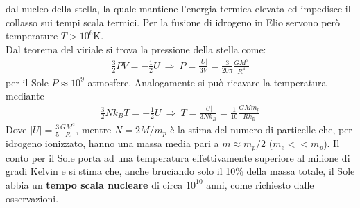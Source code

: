 \documentclass[a4paper, oneside]{book}
\begin{document}
dal nucleo della stella, la quale mantiene l'energia termica elevata ed impedisce il collasso sui tempi 
scala termici. Per la fusione di idrogeno in Elio servono però temperature $T > 10^{6}$K.\\
Dal teorema del viriale si trova la pressione della stella come:
\begin{gather*}
    \frac{3}{2}PV = -\frac{1}{2}U \ \Longrightarrow \ P = \frac{\left| U \right| }{3V} = \frac{3}{20\pi} \frac{GM^{2}}{R^{4}}
\end{gather*}
per il Sole $P \approx 10^{9}$ atmosfere. Analogamente si può ricavare la temperatura mediante
\begin{gather*}
    \frac{3}{2}Nk_B T = -\frac{1}{2}U \ \Longrightarrow \ T = \frac{\left| U \right| }{3Nk_B} = \frac{1}{10} \frac{GMm_p}{Rk_B}
\end{gather*}
Dove $\left| U \right| = \frac{3}{5}\frac{GM^{2}}{R}$, mentre  $N = 2M/m_p$ è la stima del numero di particelle
che, per idrogeno ionizzato, hanno una massa media pari a $m \approx m_p/2$ ($m_e << m_p$).  Il conto per il Sole 
porta ad una temperatura effettivamente superiore al milione di gradi Kelvin e si stima che, anche bruciando solo il 
10\% della massa totale, il Sole abbia un \textbf{tempo scala nucleare} di circa $10^{10}$ anni, come richiesto 
dalle osservazioni.
\end{document}
